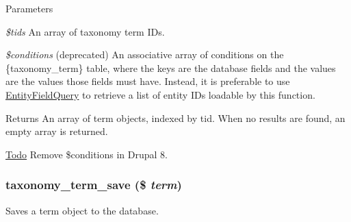 \begin{DoxyParams}{Parameters}
\item[{\em \$tids}]An array of taxonomy term IDs. \item[{\em \$conditions}](deprecated) An associative array of conditions on the \{taxonomy\_\-term\} table, where the keys are the database fields and the values are the values those fields must have. Instead, it is preferable to use \hyperlink{classEntityFieldQuery}{EntityFieldQuery} to retrieve a list of entity IDs loadable by this function.\end{DoxyParams}
\begin{DoxyReturn}{Returns}
An array of term objects, indexed by tid. When no results are found, an empty array is returned.
\end{DoxyReturn}
\begin{Desc}
\item[\hyperlink{todo__todo000021}{Todo}]Remove \$conditions in Drupal 8. \end{Desc}
\hypertarget{taxonomy_8module_a021a9a75f0cc742966ab5f2646a45ae4}{
\subsubsection[{taxonomy\_\-term\_\-save}]{\setlength{\rightskip}{0pt plus 5cm}taxonomy\_\-term\_\-save (\$ {\em term})}}
\label{taxonomy_8module_a021a9a75f0cc742966ab5f2646a45ae4}
Saves a term object to the database.


